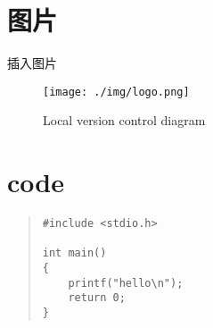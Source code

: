 \documentclass[11pt, a4paper, twoside, openany]{book}
\begin{document}
\section{图片}
插入图片
\begin{figure}[htb]
\centering
\texttt{[image: ./img/logo.png]}
\caption{Local version control diagram}
\end{figure}
\section{code}
{\footnotesize \begin{quote}\begin{verbatim}
#include <stdio.h>

int main()
{
    printf("hello\n");
    return 0;
}
\end{verbatim}\end{quote}}


\end{document}
